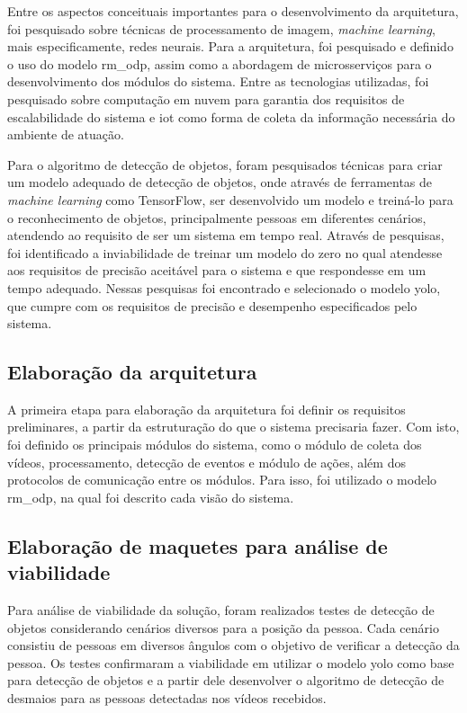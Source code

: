 \documentclass[]{politex}
\begin{document}
Entre os aspectos conceituais importantes para o desenvolvimento da arquitetura, foi pesquisado sobre técnicas de processamento de imagem, \textit{machine learning}, mais especificamente, redes neurais. Para a arquitetura, foi pesquisado e definido o uso do modelo \acrshort{rm_odp}, assim como a abordagem de microsserviços para o desenvolvimento dos módulos do sistema. Entre as tecnologias utilizadas, foi pesquisado sobre computação em nuvem para garantia dos requisitos de escalabilidade do sistema e \acrshort{iot} como forma de coleta da informação necessária do ambiente de atuação.

Para o algoritmo de detecção de objetos, foram pesquisados técnicas para criar um modelo adequado de detecção de objetos, onde através de ferramentas de \textit{machine learning} como TensorFlow, ser desenvolvido um modelo e treiná-lo para o reconhecimento de objetos, principalmente pessoas em diferentes cenários, atendendo ao requisito de ser um sistema em tempo real. Através de pesquisas, foi identificado a inviabilidade de treinar um modelo do zero no qual atendesse aos requisitos de precisão aceitável para o sistema e que respondesse em um tempo adequado. Nessas pesquisas foi encontrado e selecionado o modelo \acrshort{yolo}, que cumpre com os requisitos de precisão e desempenho especificados pelo sistema.

\subsection{Elaboração da arquitetura}
A primeira etapa para elaboração da arquitetura foi definir os requisitos preliminares, a partir da estruturação do que o sistema precisaria fazer. Com isto, foi definido os principais módulos do sistema, como o módulo de coleta dos vídeos, processamento, detecção de eventos e módulo de ações, além dos protocolos de comunicação entre os módulos. Para isso, foi utilizado o modelo \acrshort{rm_odp}, na qual foi descrito cada visão do sistema.


\subsection{Elaboração de maquetes para análise de viabilidade}
Para análise de viabilidade da solução, foram realizados testes de detecção de objetos considerando cenários diversos para a posição da pessoa. Cada cenário consistiu de pessoas em diversos ângulos com o objetivo de verificar a detecção da pessoa. Os testes confirmaram a viabilidade em utilizar o modelo \acrshort{yolo} como base para detecção de objetos e a partir dele desenvolver o algoritmo de detecção de desmaios para as pessoas detectadas nos vídeos recebidos.
\end{document}
